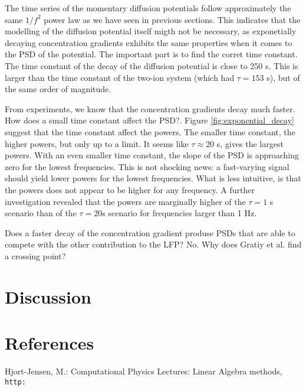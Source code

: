 \documentclass{article}
\begin{document}
The time series of the momentary diffusion potentials follow approximately the same $1/f^2$ power law as we have seen in previous sections. This indicates that the modelling of the diffusion potential itself migth not be necessary, as exponetially decaying concentration gradients exhibits the same properties when it comes to the PSD of the potential. The important part is to find the corret time constant. The time constant of the decay of the diffusion potential is close to 250 s. This is larger than the time constant of the two-ion system (which had $\tau = 153$ s), but of the same order of magnitude.

From experiments, we know that the concentration gradients decay much faster. How does a small time constant affect the PSD?. Figure \ref{fig:exponential_decay} suggest that the time constant affect the powers. The smaller time constant, the higher powers, but only up to a limit. It seems like $\tau \approx 20 $ s, gives the largest powers. With an even smaller time constant, the slope of the PSD is approaching zero for the lowest frequencies. This is not shocking news: a fast-varying signal should yield lower powers for the lowest frequencies. What is less intuitive, is that the powers does not appear to be higher for any frequency. A further investigation revealed that the powers are marginally higher of the $\tau = 1$ s scenario than of the $\tau = 20 $s scenario for frequencies larger than 1 Hz.

Does a faster decay of the concentration gradient produse PSDs that are able to compete with the other contribution to the LFP? No. Why does Gratiy et al. find a crossing point? 
\section{Discussion}

\section{References}

\begin{thebibliography}{1}
Hjort-Jensen, M.: Computational Physics Lectures: Linear
Algebra methods,
\\\texttt{http:}
\end{thebibliography}
\end{document}
